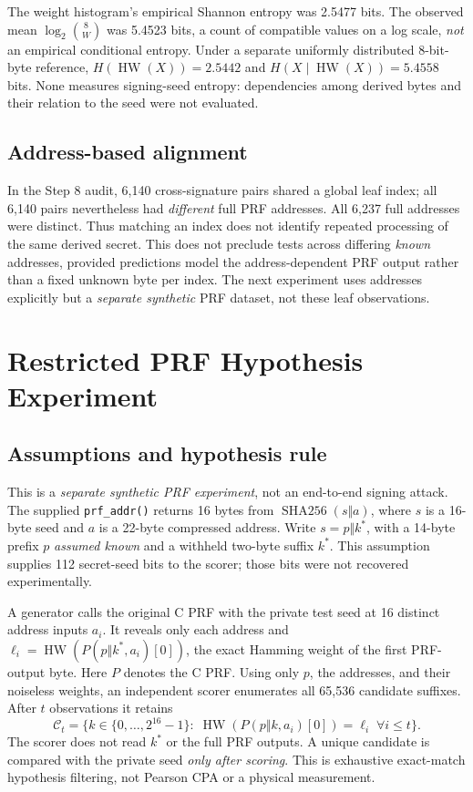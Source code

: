 \documentclass[conference,a4paper,10pt]{IEEEtran}
\begin{document}
The weight histogram's empirical Shannon entropy was 2.5477 bits. The observed mean $\log_2\binom{8}{W}$ was 5.4523 bits, a count of compatible values on a log scale, \emph{not} an empirical conditional entropy. Under a separate uniformly distributed 8-bit-byte reference, $H(\operatorname{HW}(X))=2.5442$ and $H(X\mid\operatorname{HW}(X))=5.4558$ bits. None measures signing-seed entropy: dependencies among derived bytes and their relation to the seed were not evaluated.

\subsection{Address-based alignment}
In the Step 8 audit, 6,140 cross-signature pairs shared a global leaf index; all 6,140 pairs nevertheless had \emph{different} full PRF addresses. All 6,237 full addresses were distinct. Thus matching an index does not identify repeated processing of the same derived secret. This does not preclude tests across differing \emph{known} addresses, provided predictions model the address-dependent PRF output rather than a fixed unknown byte per index. The next experiment uses addresses explicitly but a \emph{separate synthetic} PRF dataset, not these leaf observations.

\section{Restricted PRF Hypothesis Experiment}
\subsection{Assumptions and hypothesis rule}
This is a \emph{separate synthetic PRF experiment}, not an end-to-end signing attack. The supplied \texttt{prf\_addr()} returns 16 bytes from $\operatorname{SHA256}(s\Vert a)$, where $s$ is a 16-byte seed and $a$ is a 22-byte compressed address. Write $s=p\Vert k^*$, with a 14-byte prefix $p$ \emph{assumed known} and a withheld two-byte suffix $k^*$. This assumption supplies 112 secret-seed bits to the scorer; those bits were not recovered experimentally.

A generator calls the original C PRF with the private test seed at 16 distinct address inputs $a_i$. It reveals only each address and $\ell_i=\operatorname{HW}(P(p\Vert k^*,a_i)[0])$, the exact Hamming weight of the first PRF-output byte. Here $P$ denotes the C PRF. Using only $p$, the addresses, and their noiseless weights, an independent scorer enumerates all 65,536 candidate suffixes. After $t$ observations it retains
\begin{equation}
\mathcal C_t=\{k\in\{0,\ldots,2^{16}-1\}:\;
\operatorname{HW}(P(p\Vert k,a_i)[0])=\ell_i
\;\forall i\le t\}.
\label{eq:surv}
\end{equation}
The scorer does not read $k^*$ or the full PRF outputs. A unique candidate is compared with the private seed \emph{only after scoring}. This is exhaustive exact-match hypothesis filtering, not Pearson CPA or a physical measurement.
\end{document}
